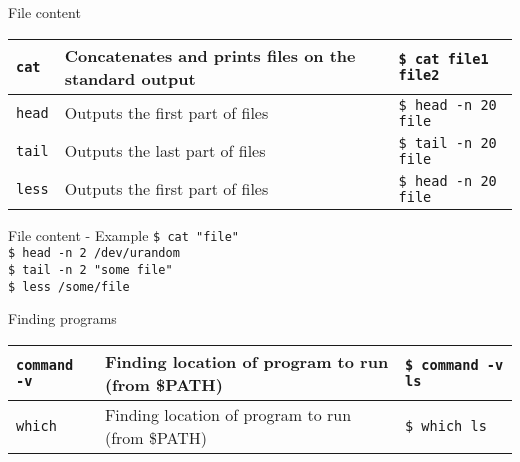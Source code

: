\documentclass{beamer}
\let\tt\texttt
\begin{document}
\begin{frame}{File content}
        \begin{tabular}{p{} p{} | p{}}
                \hline
                \tt{cat}             &
                Concatenates and prints files on the standard output &
                \tt{\$ cat file1 file2}       \\
                \hline
                \tt{head}             &
                Outputs the first part of files &
                \tt{\$ head -n 20 file}       \\
                \hline
                \tt{tail}             &
                Outputs the last part of files &
                \tt{\$ tail -n 20 file}       \\
                \hline
                \tt{less}             &
                Outputs the first part of files &
                \tt{\$ head -n 20 file}       \\
                \hline
        \end{tabular}  
\end{frame}

\begin{frame}{File content - Example}
        \tt{\$ cat "file"}         \\
        \tt{\$ head -n 2 /dev/urandom}   \\
        \tt{\$ tail -n 2 "some file"}        \\
        \tt{\$ less /some/file}                 \\
\end{frame}

\begin{frame}{Finding programs}
        \begin{tabular}{p{} p{} | p{}}
                \hline
                \tt{command -v}             &
                Finding location of program to run (from \$PATH) &
                \tt{\$ command -v ls}       \\
                \hline
                \tt{which}             &
                Finding location of program to run (from \$PATH) &
                \tt{\$ which ls}       \\
                \hline
        \end{tabular}
\end{frame}
\end{document}
